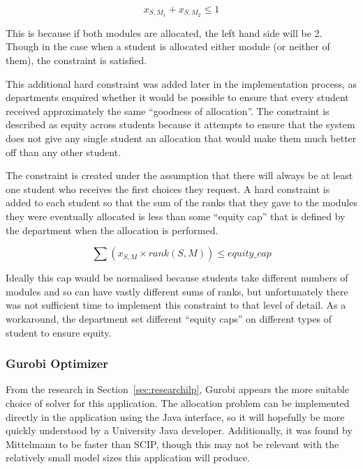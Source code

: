 $$
x_{S,M_1} + x_{S,M_2} \leq 1
$$

This is because if both modules are allocated, the left hand side will be 2.
Though in the case when a student is allocated either module (or neither of
them), the constraint is satisfied.

\mynobreakpar

This additional hard constraint was added later in the implementation process,
as departments enquired whether it would be possible to ensure that every
student received approximately the same ``goodness of allocation''. The
constraint is described as equity across students because it attempts to
ensure that the system does not give any single student an allocation that
would make them much better off than any other student.

The constraint is created under the assumption that there will always be at
least one student who receives the first choices they request. A hard
constraint is added to each student so that the sum of the ranks that they
gave to the modules they were eventually allocated is less than some ``equity
cap'' that is defined by the department when the allocation is performed.

$$
\displaystyle\sum (x_{S,M} \times rank(S,M)) \leq equity\_cap
$$

Ideally this cap would be normalised because students take different numbers
of modules and so can have vastly different sums of ranks, but unfortunately
there was not sufficient time to implement this constraint to that level of
detail. As a workaround, the department set different ``equity caps'' on
different types of student to ensure equity.

\subsubsection{Gurobi Optimizer}

From the research in Section~\ref{sec:researchilp}, Gurobi appears the more
suitable choice of solver for this application. The allocation problem can be
implemented directly in the application using the Java interface, so it will
hopefully be more quickly understood by a University Java developer.
Additionally, it was found by Mittelmann to be faster than SCIP, though this
may not be relevant with the relatively small model sizes this application
will produce.


